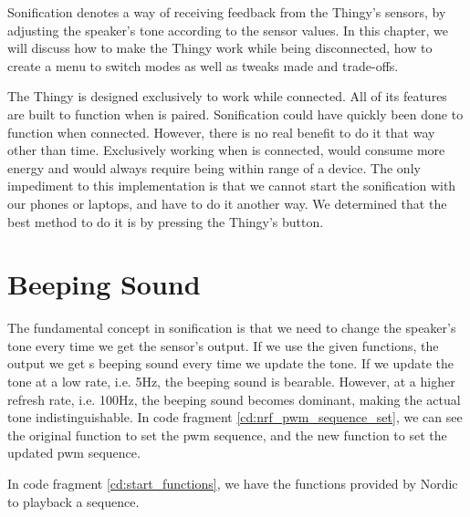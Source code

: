 Sonification denotes a way of receiving feedback from the Thingy's sensors, by adjusting the speaker's tone according to the sensor values. In this chapter, we will discuss how to make the Thingy work while being disconnected, how to create a menu to switch modes as well as tweaks made and trade-offs.

The Thingy is designed exclusively to work while connected. All of its features are built to function when \bt is paired. Sonification could have quickly been done to function when connected. However, there is no real benefit to do it that way other than time. Exclusively working when \bt is connected, would consume more energy and would always require being within range of a device. The only impediment to this implementation is that we cannot start the sonification with our phones or laptops, and have to do it another way. We determined that the best method to do it is by pressing the Thingy's button. 

\section{Beeping Sound}

The fundamental concept in sonification is that we need to change the speaker's tone every time we get the sensor's output. If we use the given functions, the output we get s beeping sound every time we update the tone. If we update the tone at a low rate, i.e. 5Hz, the beeping sound is bearable. However, at a higher refresh rate, i.e. 100Hz, the beeping sound becomes dominant, making the actual tone indistinguishable. In code fragment \ref{cd:nrf_pwm_sequence_set}, we can see the original function to set the \gls{pwm} sequence, and the new function to set the updated \gls{pwm} sequence.



In code fragment \ref{cd:start_functions}, we have the functions provided by Nordic to playback a sequence.


\makebox[\linewidth][c]{$\smash{\vdots}$}


\makebox[\linewidth][c]{$\smash{\vdots}$}

\makebox[\linewidth][c]{$\smash{\vdots}$}


